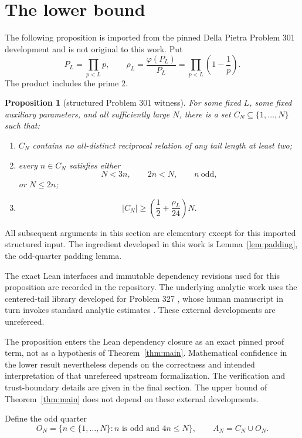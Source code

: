 \documentclass[11pt]{article}
\newtheorem{proposition}[theorem]{Proposition}
\theoremstyle{definition}
\theoremstyle{plain}
\begin{document}
\section{The lower bound}

The following proposition is imported from the pinned Della Pietra Problem
301 development \cite{DellaPietra301} and is not original to this work.  Put
\[
 P_L=\prod_{p<L}p,
 \qquad
 \rho_L=\frac{\varphi(P_L)}{P_L}
       =\prod_{p<L}\left(1-\frac1p\right).
\]
The product includes the prime $2$.

\begin{proposition}[structured Problem 301 witness]\label{prop:structured}
For some fixed $L$, some fixed auxiliary parameters, and all sufficiently
large $N$, there is a set $C_N\subseteq\{1,\ldots,N\}$ such that:
\begin{enumerate}
\item $C_N$ contains no all-distinct reciprocal relation of any tail length
      at least two;
\item every $n\in C_N$ satisfies either
\[
 N<3n,\qquad 2n<N,\qquad n\ \text{odd},
\]
or $N\leq2n$;
\item
\[
 |C_N|\geq\left(\frac12+\frac{\rho_L}{24}\right)N.
\]
\end{enumerate}
\end{proposition}

All subsequent arguments in this section are elementary except for this
imported structured input.  The ingredient developed in this work is
Lemma~\ref{lem:padding}, the odd-quarter padding lemma.

The exact Lean interfaces and immutable dependency revisions used for this
proposition are recorded in the repository.  The underlying analytic work
uses the centered-tail library developed for Problem 327
\cite{DellaPietra327}, whose human manuscript in turn invokes standard
analytic estimates \cite{Tenenbaum2015,BretecheTenenbaum2026}.  These external
developments are unrefereed.

The proposition enters the Lean dependency closure as an exact pinned proof
term, not as a hypothesis of Theorem~\ref{thm:main}.  Mathematical confidence
in the lower result nevertheless depends on the correctness and intended
interpretation of that unrefereed upstream formalization.  The verification
and trust-boundary details are given in the final section.  The upper bound of
Theorem~\ref{thm:main} does not depend on these external developments.

Define the odd quarter
\[
 O_N=\{n\in\{1,\ldots,N\}: n\text{ is odd and }4n\leq N\},
 \qquad A_N=C_N\cup O_N.
\]
\end{document}
